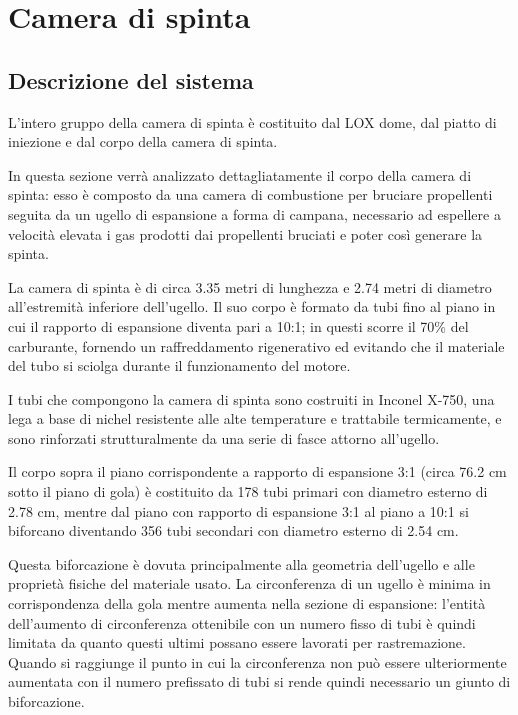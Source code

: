 \section{Camera di spinta}
\label{sec:camera spinta}

\subsection{Descrizione del sistema}
\label{subsec:descrizione camera spinta}

L’intero gruppo della camera di spinta è costituito dal LOX dome, dal piatto di iniezione e dal corpo della camera di spinta.

In questa sezione verrà analizzato dettagliatamente il corpo della camera di spinta: esso è composto da una camera di combustione per bruciare propellenti seguita da un ugello di espansione a forma di campana, necessario ad espellere a velocità elevata i gas prodotti dai propellenti bruciati e poter così generare la spinta.

La camera di spinta è di circa 3.35 metri di lunghezza e 2.74 metri di diametro all'estremità inferiore dell'ugello. Il suo corpo è formato da tubi fino al piano in cui il rapporto di espansione diventa pari a 10:1; in questi scorre il 70\% del carburante, fornendo un raffreddamento rigenerativo ed evitando che il materiale del tubo si sciolga durante il funzionamento del motore.

I tubi che compongono la camera di spinta sono costruiti in Inconel X-750, una lega a base di nichel resistente alle alte temperature e trattabile termicamente, e sono rinforzati strutturalmente da una serie di fasce attorno all'ugello.

Il corpo sopra il piano corrispondente a rapporto di espansione 3:1 (circa 76.2 cm sotto il piano di gola) è costituito da 178 tubi primari con diametro esterno di 2.78 cm, mentre dal piano con rapporto di espansione 3:1 al piano a 10:1 si biforcano diventando 356 tubi secondari con diametro esterno di 2.54 cm.

Questa biforcazione è dovuta principalmente alla geometria dell'ugello e alle proprietà fisiche del materiale usato. La circonferenza di un ugello è minima in corrispondenza della gola mentre aumenta nella sezione di espansione: l'entità dell'aumento di circonferenza ottenibile con un numero fisso di tubi è quindi limitata da quanto questi ultimi possano essere lavorati per rastremazione. Quando si raggiunge il punto in cui la circonferenza non può essere ulteriormente aumentata con il numero prefissato di tubi si rende quindi necessario un giunto di biforcazione.

